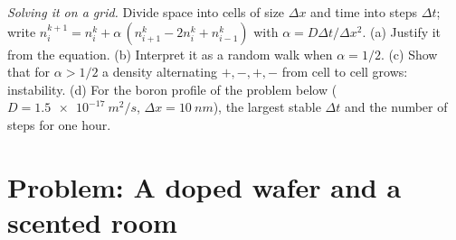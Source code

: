 \begin{exercise}[$\star\star\star$]\label{exo:b2:particle-diffusion:12}
\emph{Solving it on a grid.} Divide space into cells of size $\Delta x$
and time into steps $\Delta t$; write $n_i^{k+1} = n_i^k + \alpha\,(n_{i+1}^k
- 2n_i^k + n_{i-1}^k)$ with $\alpha = D\Delta t/\Delta x^2$. (a) Justify
it from the equation. (b) Interpret it as a random walk when $\alpha =
1/2$. (c) Show that for $\alpha > 1/2$ a density alternating $+,-,+,-$
from cell to cell grows: instability. (d) For the boron profile of the
problem below ($D = \qty{1.5e-17}{m^2/s}$, $\Delta x = \qty{10}{nm}$),
the largest stable $\Delta t$ and the number of steps for one hour.
\end{exercise}

\section{Problem: A doped wafer and a scented room}

